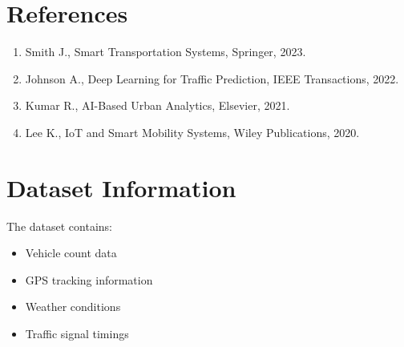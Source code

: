 \documentclass[12pt,a4paper]{report}
\begin{document}
	
	\chapter*{References}
	
	\begin{enumerate}
		
		\item Smith J., Smart Transportation Systems, Springer, 2023.
		
		\item Johnson A., Deep Learning for Traffic Prediction, IEEE Transactions, 2022.
		
		\item Kumar R., AI-Based Urban Analytics, Elsevier, 2021.
		
		\item Lee K., IoT and Smart Mobility Systems, Wiley Publications, 2020.
		
	\end{enumerate}
	
	
	\appendix
	
	\chapter{Dataset Information}
	
	The dataset contains:
	
	\begin{itemize}
		
		\item Vehicle count data
		
		\item GPS tracking information
		
		\item Weather conditions
		
		\item Traffic signal timings
		
	\end{itemize}
	
\end{document}
